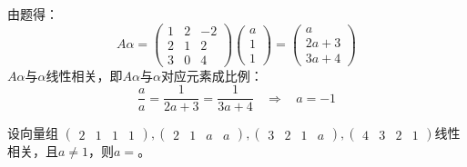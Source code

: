 \documentclass[a4paper]{report}
\begin{document}
\begin{jie}
由题得：
\begin{equation*}
A\alpha=\begin{pmatrix}
1&2&-2\\ 2&1&2\\ 3&0&4
\end{pmatrix}\begin{pmatrix}
a\\ 1\\ 1
\end{pmatrix}=\begin{pmatrix}
a\\ 2a+3 \\ 3a+4
\end{pmatrix}
\end{equation*}
$A\alpha$与$\alpha$线性相关，即$A\alpha$与$\alpha$对应元素成比例：
\begin{equation*}
\frac{a}{a}=\frac{1}{2a+3}=\frac{1}{3a+4}~~~~\Rightarrow~~~~a=-1
\end{equation*}
\end{jie}

\EX 设向量组
$
\begin{pmatrix}
2&1&1&1
\end{pmatrix},
\begin{pmatrix}
2&1&a&a
\end{pmatrix},
\begin{pmatrix}
3&2&1&a
\end{pmatrix},
\begin{pmatrix}
4&3&2&1
\end{pmatrix}
$线性相关，且$a\neq 1$，则$a=$\underline{\hphantom{~~~~~~~~}}。
\end{document}
